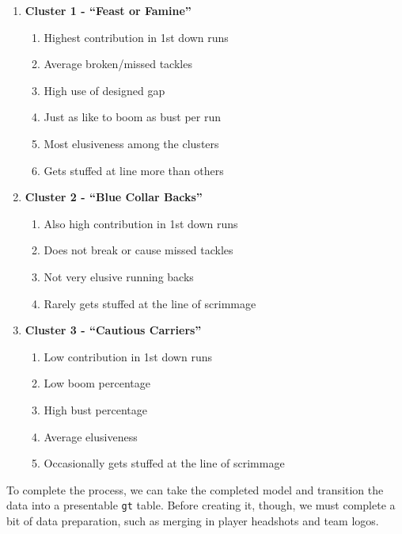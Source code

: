 \documentclass[
  letterpaper,
]{krantz}
\providecommand{\tightlist}{%
  \setlength{\itemsep}{0pt}\setlength{\parskip}{0pt}}\usepackage{longtable,booktabs,array}
\begin{document}
\begin{enumerate}
\def\labelenumi{\arabic{enumi}.}
\tightlist
\item
  \textbf{Cluster 1 - ``Feast or Famine''}

  \begin{enumerate}
  \def\labelenumii{\arabic{enumii}.}
  \tightlist
  \item
    Highest contribution in 1st down runs
  \item
    Average broken/missed tackles
  \item
    High use of designed gap
  \item
    Just as like to boom as bust per run
  \item
    Most elusiveness among the clusters
  \item
    Gets stuffed at line more than others
  \end{enumerate}
\item
  \textbf{Cluster 2 - ``Blue Collar Backs''}

  \begin{enumerate}
  \def\labelenumii{\arabic{enumii}.}
  \tightlist
  \item
    Also high contribution in 1st down runs
  \item
    Does not break or cause missed tackles
  \item
    Not very elusive running backs
  \item
    Rarely gets stuffed at the line of scrimmage
  \end{enumerate}
\item
  \textbf{Cluster 3 - ``Cautious Carriers''}

  \begin{enumerate}
  \def\labelenumii{\arabic{enumii}.}
  \tightlist
  \item
    Low contribution in 1st down runs
  \item
    Low boom percentage
  \item
    High bust percentage
  \item
    Average elusiveness
  \item
    Occasionally gets stuffed at the line of scrimmage
  \end{enumerate}
\end{enumerate}

To complete the process, we can take the completed model and transition
the data into a presentable \texttt{gt} table. Before creating it,
though, we must complete a bit of data preparation, such as merging in
player headshots and team logos.
\end{document}
